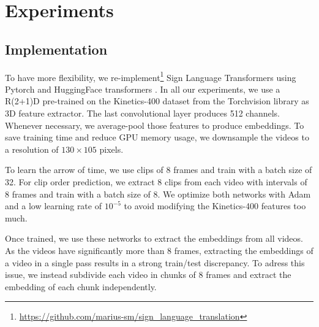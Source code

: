 \documentclass[final]{cvpr}
\begin{document}
\section{Experiments}
\subsection{Implementation}

To have more flexibility, we re-implement\footnote{\url{https://github.com/marius-sm/sign_language_translation}} Sign Language Transformers \cite{neccam} using Pytorch and HuggingFace transformers \cite{huggingface}. In all our experiments, we use a R(2+1)D \cite{r2plus1} pre-trained on the Kinetics-400 \cite{kinetics} dataset from the Torchvision library as 3D feature extractor. The last convolutional layer produces 512 channels. Whenever necessary, we average-pool those features to produce embeddings. To save training time and reduce GPU memory usage, we downsample the videos to a resolution of $130\times105$ pixels.

To learn the arrow of time, we use clips of 8 frames and train with a batch size of 32. For clip order prediction, we extract 8 clips from each video with intervals of 8 frames and train with a batch size of 8. We optimize both networks with Adam and a low learning rate of $10^{-5}$ to avoid modifying the Kinetics-400 features too much.

Once trained, we use these networks to extract the embeddings from all videos. As the videos have significantly more than 8 frames,  extracting the embeddings of a video in a single pass results in a strong train/test discrepancy. To adress this issue, we instead subdivide each video in chunks of 8 frames and extract the embedding of each chunk independently.
\end{document}
